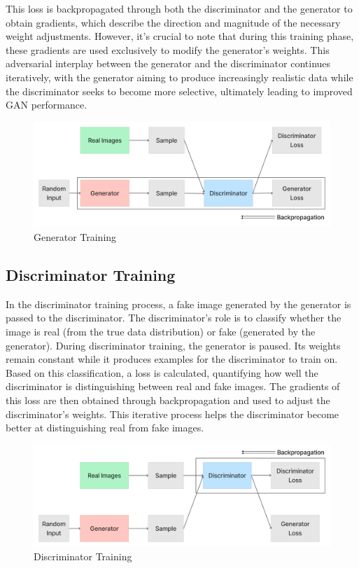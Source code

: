 \clearpage

\noindent
This loss is backpropagated through both the discriminator and the generator to obtain gradients, which describe the direction and magnitude of the necessary weight adjustments. However, it's crucial to note that during this training phase, these gradients are used exclusively to modify the generator's weights. This adversarial interplay between the generator and the discriminator continues iteratively, with the generator aiming to produce increasingly realistic data while the discriminator seeks to become more selective, ultimately leading to improved GAN performance.

\begin{figure}[h!]
    \centering
    \includegraphics[width=\textwidth]{Images/gen_training.png}
    \caption{Generator Training}
\end{figure}

\subsection{Discriminator Training}

\noindent
In the discriminator training process, a fake image generated by the generator is passed to the discriminator. The discriminator's role is to classify whether the image is real (from the true data distribution) or fake (generated by the generator). During discriminator training, the generator is paused. Its weights remain constant while it produces examples for the discriminator to train on. Based on this classification, a loss is calculated, quantifying how well the discriminator is distinguishing between real and fake images. The gradients of this loss are then obtained through backpropagation and used to adjust the discriminator's weights. This iterative process helps the discriminator become better at distinguishing real from fake images.

\clearpage

\begin{figure}[h!]
    \centering
    \includegraphics[width=\textwidth]{Images/dis_training.png}
    \caption{Discriminator Training}
\end{figure}

